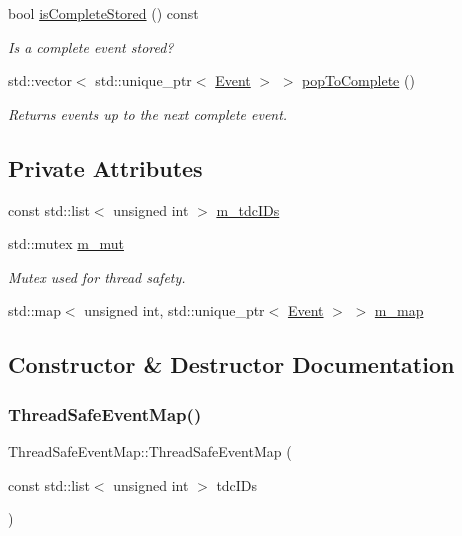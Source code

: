 \begin{DoxyCompactItemize}
bool \hyperlink{class_thread_safe_event_map_a9fb58083137d147811de5b93f991d044}{is\+Complete\+Stored} () const
\begin{DoxyCompactList}\small\item\em Is a complete event stored? \end{DoxyCompactList}\item 
std\+::vector$<$ std\+::unique\+\_\+ptr$<$ \hyperlink{class_event}{Event} $>$ $>$ \hyperlink{class_thread_safe_event_map_adc6c905693e3b9b54671299e7610d5b6}{pop\+To\+Complete} ()
\begin{DoxyCompactList}\small\item\em Returns events up to the next complete event. \end{DoxyCompactList}\end{DoxyCompactItemize}
\subsection*{Private Attributes}
\begin{DoxyCompactItemize}
\item 
const std\+::list$<$ unsigned int $>$ \hyperlink{class_thread_safe_event_map_ad079392d8a51bb1cc7835c52489fa6ca}{m\+\_\+tdc\+I\+Ds}
\item 
std\+::mutex \hyperlink{class_thread_safe_event_map_ada4e8c2f2195df86503e73674ff30935}{m\+\_\+mut}
\begin{DoxyCompactList}\small\item\em Mutex used for thread safety. \end{DoxyCompactList}\item 
std\+::map$<$ unsigned int, std\+::unique\+\_\+ptr$<$ \hyperlink{class_event}{Event} $>$ $>$ \hyperlink{class_thread_safe_event_map_a27b0ae4416f249242636545a0600d7c5}{m\+\_\+map}
\end{DoxyCompactItemize}


\subsection{Constructor \& Destructor Documentation}
\mbox{\label{class_thread_safe_event_map_ace03ee2a6017dfee50a61c68626d2345}} 
\subsubsection{\texorpdfstring{Thread\+Safe\+Event\+Map()}{ThreadSafeEventMap()}\hspace{0.1cm}{\footnotesize\ttfamily [1/3]}}
{\footnotesize\ttfamily Thread\+Safe\+Event\+Map\+::\+Thread\+Safe\+Event\+Map (\begin{DoxyParamCaption}\item[{const std\+::list$<$ unsigned int $>$}]{tdc\+I\+Ds }\end{DoxyParamCaption})}



